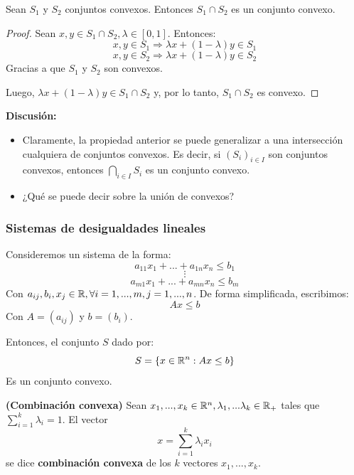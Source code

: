   


\begin{proposicion}
	Sean $S_1$ y $S_2$ conjuntos convexos. Entonces $S_1 \cap S_2$ es un conjunto convexo. 
\end{proposicion}

\begin{proof}
	Sean $x,y \in S_1 \cap S_2, \lambda \in [0,1]$. Entonces: 
	$$ x, y \in S_1 \Longrightarrow \lambda x + (1 - \lambda) y \in S_1$$ 
	$$ x, y \in S_2 \Longrightarrow \lambda x + (1 - \lambda) y \in S_2 $$
	Gracias a que $S_1$ y $S_2$ son convexos.  
	
	Luego, $\lambda x + ( 1 - \lambda ) y  \in S_1 \cap S_2$ y, por lo tanto, $S_1 \cap S_2$ es convexo.
\end{proof}  


\textbf{Discusión:}
\begin{itemize}
	\item Claramente, la propiedad anterior se puede generalizar a una intersección cualquiera de conjuntos convexos. Es decir, si $(S_i)_{i\in I}$ son conjuntos convexos, entonces $\bigcap _{i\in I} S_i$ es un conjunto convexo.  
	\bigskip 
	\item ¿Qué se puede decir sobre la unión de convexos? 
\end{itemize}

\subsubsection{Sistemas de desigualdades lineales}
\begin{ejemplo}
	Consideremos un sistema de la forma: 
	$$ a_{11} x_1 + ... + a_{1n}x_n \leq b_1 $$ 
	$$ \vdots $$ 
	$$ a_{m1} x_1 + ... + a_{mn} x_n \leq b_m $$ 
	Con $a_{ij}, b_i, x_j \in \mathbb{R}, \forall i = 1, ... , m , j = 1 , ... , n$. 
	De forma simplificada, escribimos: 
	$$ A x \leq b $$ 
	Con $A = (a_{ij})$ y $b = (b_i)$. 
	
	Entonces, el conjunto $S$ dado por: 
	$$ S  = \{ x \in \mathbb{R}^n : A x \leq b \} $$ 
	Es un conjunto convexo. 
\end{ejemplo}

\begin{definicion}
	\textbf{(Combinación convexa)} 
	Sean $x_1, ... , x_k \in \mathbb{R}^n, \lambda_1 , ... \lambda_k \in \mathbb{R}_+$ tales que $\sum_{i = 1}^{k} \lambda_i = 1$. El vector
	$$ x = \sum_{i=1}^{k}\lambda_i x_i $$
	se dice \textbf{combinación convexa} de los $k$ vectores $x_1, ... , x_k$. 
\end{definicion}

